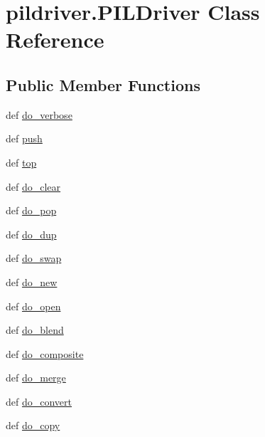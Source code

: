 \hypertarget{classpildriver_1_1_p_i_l_driver}{\section{pildriver.\-P\-I\-L\-Driver Class Reference}
\label{classpildriver_1_1_p_i_l_driver}
}
\subsection*{Public Member Functions}
\begin{DoxyCompactItemize}
\item 
def \hyperlink{classpildriver_1_1_p_i_l_driver_ae2bc694f45dea3ff24adb27f4328d9d2}{do\-\_\-verbose}
\item 
def \hyperlink{classpildriver_1_1_p_i_l_driver_aaf1a87c8f0d288f78163a6fbbb66ac73}{push}
\item 
def \hyperlink{classpildriver_1_1_p_i_l_driver_a72b39c1e83587ca983b86c4c2989af91}{top}
\item 
def \hyperlink{classpildriver_1_1_p_i_l_driver_a044ede8168f58cbacad98b34217d1dda}{do\-\_\-clear}
\item 
def \hyperlink{classpildriver_1_1_p_i_l_driver_abcbfe0f2309ff94290d5abe819a2d859}{do\-\_\-pop}
\item 
def \hyperlink{classpildriver_1_1_p_i_l_driver_ae714f77a792f097543b636507b1bc19f}{do\-\_\-dup}
\item 
def \hyperlink{classpildriver_1_1_p_i_l_driver_a79fd81ebdf317003879dce6114543ce8}{do\-\_\-swap}
\item 
def \hyperlink{classpildriver_1_1_p_i_l_driver_ad544273451a7a8e36f87079ac25aebfd}{do\-\_\-new}
\item 
def \hyperlink{classpildriver_1_1_p_i_l_driver_aa4dee3feea3c9f169f61eccbc2126c92}{do\-\_\-open}
\item 
def \hyperlink{classpildriver_1_1_p_i_l_driver_a9f86e478c5eb44f1d5bbc9b8dd274cc9}{do\-\_\-blend}
\item 
def \hyperlink{classpildriver_1_1_p_i_l_driver_a6168d03444bee28ae1adcf48a95de1d8}{do\-\_\-composite}
\item 
def \hyperlink{classpildriver_1_1_p_i_l_driver_a1b88b80b78e8ea4f90f5e5f2a69f5d47}{do\-\_\-merge}
\item 
def \hyperlink{classpildriver_1_1_p_i_l_driver_aba4c887b37d9a23e4bf46bfad040e6ea}{do\-\_\-convert}
\item 
def \hyperlink{classpildriver_1_1_p_i_l_driver_ac276737a5eaf97067bc25757d28ea0a1}{do\-\_\-copy}

\end{DoxyCompactItemize}
